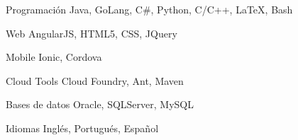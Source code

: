 

\begin{cvskills}

  \cvskill
    {Programación} %
    {Java, GoLang, C\#, Python, C/C++, LaTeX, Bash} %

  \cvskill
    {Web} %
    {AngularJS, HTML5, CSS, JQuery} %

  \cvskill
    {Mobile} %
    {Ionic, Cordova} %
    
  \cvskill
    {Cloud Tools} %
    {Cloud Foundry, Ant, Maven} %

  \cvskill
    {Bases de datos} %
    {Oracle, SQLServer, MySQL} %
        
  \cvskill
    {Idiomas} %
    {Inglés, Portugués, Español} %
    

\end{cvskills}

